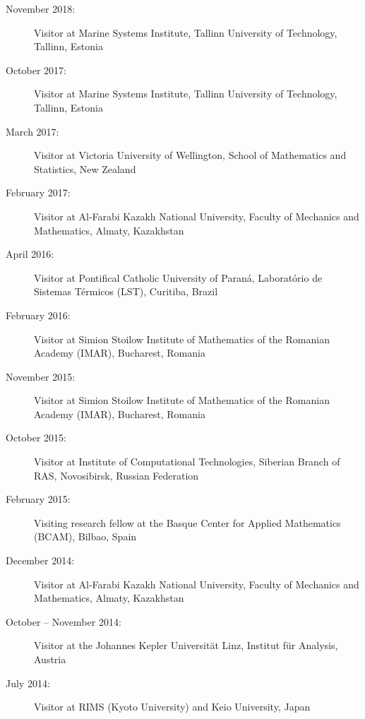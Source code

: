 \documentclass[final, a4paper, oneside, 12pt]{article}
\numberwithin{equation}{section}
\begin{document}
\begin{description}


  \item[November 2018:] Visitor at Marine Systems Institute, Tallinn University of Technology, Tallinn, Estonia

  \item[October 2017:] Visitor at Marine Systems Institute, Tallinn University of Technology, Tallinn, Estonia

  \item[March 2017:] Visitor at Victoria University of Wellington, School of Mathematics and Statistics, New Zealand
  
  \item[February 2017:] Visitor at Al-Farabi Kazakh National University, Faculty of Mechanics and Mathematics, Almaty, Kazakhstan
  
  \item[April 2016:] Visitor at Pontifical Catholic University of Paran\'a, Laborat\'orio de Sistemas T\'ermicos (LST), Curitiba, Brazil
  
  \item[February 2016:] Visitor at Simion Stoilow Institute of Mathematics of the Romanian Academy (IMAR), Bucharest, Romania
  
  \item[November 2015:] Visitor at Simion Stoilow Institute of Mathematics of the Romanian Academy (IMAR), Bucharest, Romania
  
  \item[October 2015:] Visitor at Institute of Computational Technologies, Siberian Branch of RAS, Novosibirsk, Russian Federation
  
  \item[February 2015:] Visiting research fellow at the Basque Center for Applied Mathematics (BCAM), Bilbao, Spain
  
  \item[December 2014:] Visitor at Al-Farabi Kazakh National University, Faculty of Mechanics and Mathematics, Almaty, Kazakhstan

  \item [October -- November 2014:] Visitor at the Johannes Kepler Universit\"at Linz, Institut f\"ur Analysis, Austria

  \item [July 2014:] Visitor at RIMS (Kyoto University) and Keio University, Japan
  

\end{description}
\end{document}
